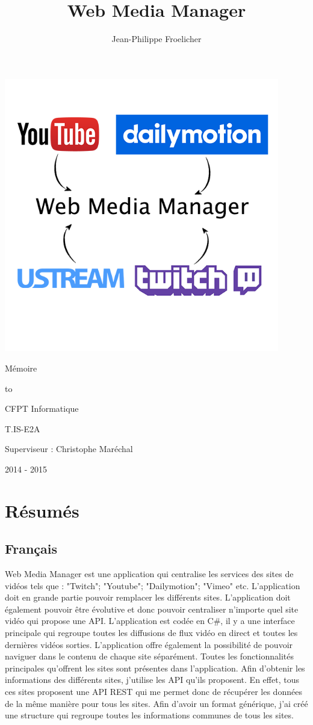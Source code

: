 \documentclass[11pt]{report} %
\title{Web Media Manager}
\author{Jean-Philippe Froelicher}
\date{} %
\makeatletter
\def\maketitle{%
	\null
	\thispagestyle{empty}%
	\vskip 1cm
	\begin{center}
		\Huge \strut \@title \par
		\large \strut Mémoire
	\end{center}
	\ifhmode\par\fi
	\hbox to \hsize{\hfill
		\vrule height 2pt width.5\hsize
		\hfill}%
	\begin{center}
		\normalfont\large CFPT Informatique\par
		\normalfont\large\@author\par
		\normalfont T.IS-E2A
	\end{center}
	
	\begin{center}
		\normalfont\large Superviseur : Christophe Maréchal
	\end{center}
	
	\begin{center}
		\normalfont\large 2014 - 2015
	\end{center}
	\par
	\vfil
	\vfil
	\null
	\cleardoublepage
}
\makeatother
\begin{document}
\includegraphics[width=0.9\textwidth]{../img/logoWebMediaManager.png}
\maketitle

\newpage

\tableofcontents

\chapter{Résumés}
	\section{Français}
		Web Media Manager est une application qui centralise les services des sites de vidéos tels que :
		"Twitch"; "Youtube"; "Dailymotion"; "Vimeo" etc. L'application doit en grande partie pouvoir remplacer les différents sites. L'application doit également pouvoir être évolutive et donc pouvoir
		centraliser n'importe quel site vidéo qui propose une API.
		L'application est codée en C\#, il y a une interface principale qui regroupe toutes les diffusions de
		flux vidéo en direct et toutes les dernières vidéos sorties. L'application offre également la possibilité de pouvoir naviguer dans le contenu de chaque site séparément. Toutes les fonctionnalités principales qu'offrent les sites sont présentes dans l'application.
		Afin d'obtenir les informations des différents sites, j'utilise les API qu'ils proposent. En effet, tous ces sites proposent une API REST qui me permet donc de récupérer les données de la même
		manière pour tous les sites. Afin d'avoir un format générique, j'ai créé une structure qui regroupe
		toutes les informations communes de tous les sites.
	
\end{document}
